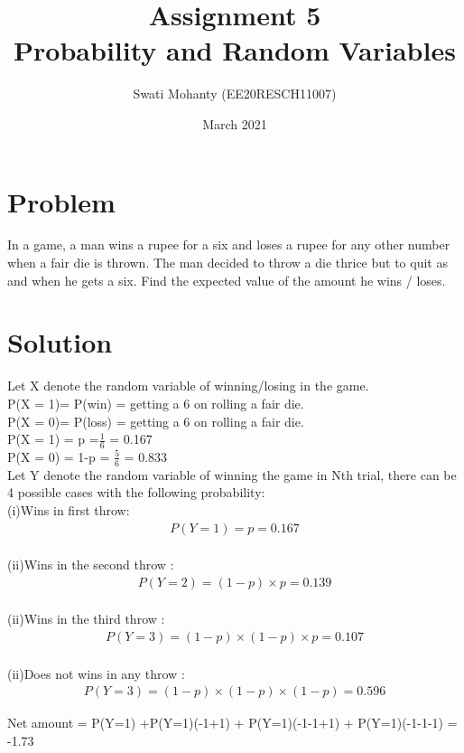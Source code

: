 \documentclass[journal,12pt,twocolumn]{IEEEtran}
\title{Assignment 5
\\Probability and Random Variables }
\author{Swati Mohanty (EE20RESCH11007) }
\date{March 2021}
\begin{document}
\maketitle


\section{Problem}
In a game, a man wins a rupee for a six and
loses a rupee for any other number when a
fair die is thrown. The man decided to throw
a die thrice but to quit as and when he gets a
six. Find the expected value of the amount he
wins / loses.

\section{Solution}
Let X denote the random variable of winning/losing in the game.
\\P(X = 1)= P(win) = getting a 6 on rolling a fair die.
\\P(X = 0)= P(loss) = getting a 6 on rolling a fair die.
\\P(X = 1) = p =$\frac{1}{6}$  = 0.167
\\P(X = 0) = 1-p = $\frac{5}{6}$ = 0.833
\\Let Y denote the random variable of winning the game in Nth trial, there can be 4 possible cases with the following probability:
\\(i)Wins in first throw:\begin{align}
    P(Y=1) = p = 0.167
\end{align}
\\(ii)Wins in the second throw :\begin{align}
    P(Y=2) = (1-p)\times p = 0.139
\end{align}
\\(ii)Wins in the third throw :\begin{align}
    P(Y=3) = (1-p)\times(1-p)\times p = 0.107
\end{align}
\\(ii)Does not wins in any throw :\begin{align}
    P(Y=3) = (1-p)\times(1-p)\times (1-p) = 0.596
\end{align}

Net amount = P(Y=1) +P(Y=1)\times(-1+1) + P(Y=1)\times(-1-1+1) + P(Y=1)\times(-1-1-1) = -1.73
\end{document}
